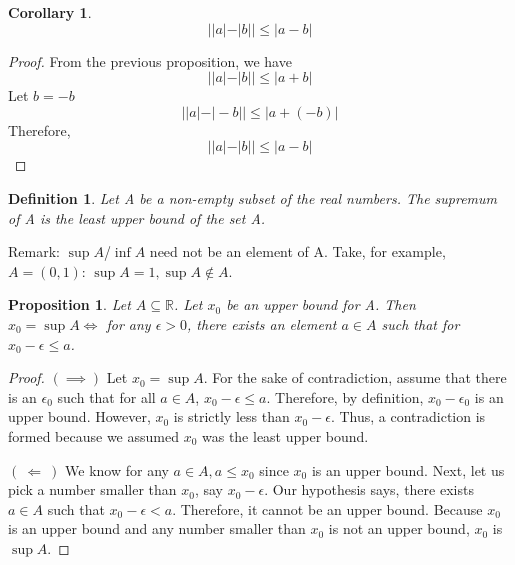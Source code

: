 \documentclass[12pt,reqno]{amsart}
\theoremstyle{plain}
\newtheorem{definition}{Definition}
\newtheorem{corollary}{Corollary}
\newtheorem{proposition}{Proposition}
\begin{document}
\begin{corollary}
    \[ ||a| - |b|| \le |a-b| \]
\end{corollary}
\begin{proof}
    From the previous proposition, we have
    \[ ||a| - |b|| \le |a+b| \]
    Let $b = -b$
    \[ ||a| - |-b|| \le |a+(-b)|\]
    Therefore,
    \[ ||a| - |b|| \le |a-b|\]
\end{proof}

\pagebreak

\begin{definition}
    Let A be a non-empty subset of the real numbers. The supremum of A is the least upper bound of the set A.
\end{definition}

Remark: $\sup{A}$/$\inf{A}$ need not be an element of A. Take, for example, $A = (0,1)$: $\sup{A} = 1, \sup{A} \not \in A$.

\begin{proposition}
    Let $A \subseteq \mathbb{R}$. Let $x_0$ be an upper bound for A. 
    Then $x_0 = \sup{A} \iff $ for any $ \epsilon > 0$, there exists an element $a \in A$ such that for $x_0 - \epsilon \le a$.
\end{proposition}

\begin{proof} 
    $(\implies)$ 
    Let $x_0 = \sup{A}$. For the sake of contradiction, assume that there is an $\epsilon_0$ such that for all $a \in A$, $x_0 - \epsilon \le a$.
    Therefore, by definition, $x_0 - \epsilon_0$ is an upper bound. 
    However, $x_0$ is strictly less than $x_0 - \epsilon$.
    Thus, a contradiction is formed because we assumed $x_0$ was the least upper bound.

    $(\ \Longleftarrow \ )$ We know for any $a \in A, a \le x_0$ since $x_0$ is an upper bound.
    Next, let us pick a number smaller than $x_0$, say $x_0 - \epsilon$. 
    Our hypothesis says, there exists $a \in A$ such that $x_0 - \epsilon < a$.
    Therefore, it cannot be an upper bound. Because $x_0$ is an upper bound and any number smaller than $x_0$ is not an upper bound, $x_0$ is $\sup{A}$.
\end{proof}

\vspace{10 mm}
\end{document}
